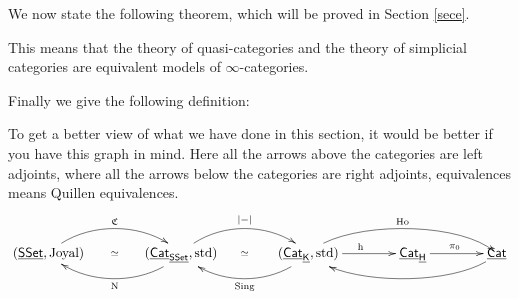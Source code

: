 We now state the following theorem, which will be proved in Section \ref{sece}.


This means that the theory of quasi-categories and the theory of simplicial categories are equivalent models of $\infty$-categories.

Finally we give the following definition:


To get a better view of what we have done in this section, it would be better if you have this graph in mind. Here all the arrows
above the categories are left adjoints, where all the arrows below the categories are right adjoints, equivalences
means Quillen equivalences.
$$\xymatrix @C=40pt{
    (\cat{SSet},\text{Joyal})\ar@(ru,lu)[r]^{\C}\ar@{}[r]|{\simeq}
    &(\cat{Cat}_{\cat{SSet}},\text{std})\ar@(ld,rd)[l]^{\N}\ar@(ru,lu)[r]^{\abs-}\ar@{}[r]|{\simeq}
    &(\cat{Cat}_{\cat{K}},\text{std})\ar@(ld,rd)[l]^{\Sing}\ar[r]^{\h}\ar@(ru,lu)[rr]^{\Ho}
    &\cat{Cat}_{\cat H}\ar[r]^{\pi_0}
    &\cat{Cat}\ar@(ld,rd)[ll]
}$$